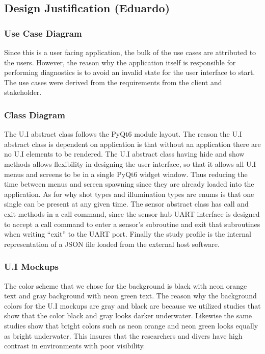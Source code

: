 \subsection{Design Justification (Eduardo)}
\subsubsection{Use Case Diagram}
Since this is a user facing application, the bulk of the use cases are attributed to the users. However, the reason why the application itself is responsible for performing diagnostics is to avoid an invalid state for the user interface to start. The use cases were derived from the requirements from the client and stakeholder.
\subsubsection{Class Diagram}
The U.I abstract class follows the PyQt6 module layout. The reason the U.I abstract class is dependent on application is that without an application there are no U.I elements to be rendered. The U.I abstract class having hide and show methods allows flexibility in designing the user interface, so that it allows all U.I menus and screens to be in a single PyQt6 widget window. Thus reducing the time between menus and screen spawning since they are already loaded into the application. As for why shot types and illumination types are enums is that one single can be present at any given time. The sensor abstract class has call and exit methods in a call command, since the sensor hub UART interface is designed to accept a call command to enter a sensor's subroutine and exit that subroutines when writing ``exit'' to the UART port. Finally the study profile is the internal representation of a JSON file loaded from the external host software.
\subsubsection{U.I Mockups}
The color scheme that we chose for the background is black with neon orange text and gray background with neon green text. The reason why the background colors for the U.I mockups are gray and black are because we utilized studies that show that the color black and gray looks darker underwater.\cite{AquaticSafetyGroup2021}\cite{FluoGreenMost2018} Likewise the same studies show that bright colors such as neon orange and neon green looks equally as bright underwater.\cite{AquaticSafetyGroup2021}\cite{FluoGreenMost2018} This insures that the researchers and divers have high contrast in environments with poor visibility.